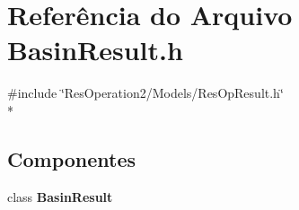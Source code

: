 \section{Referência do Arquivo Basin\+Result.\+h}
\label{_2_models_2_basin_2_basin_result_8h}
{\ttfamily \#include \char`\"{}Res\+Operation2/\+Models/\+Res\+Op\+Result.\+h\char`\"{}}\\*
\subsection*{Componentes}
\begin{DoxyCompactItemize}
\item 
class {\bf Basin\+Result}
\end{DoxyCompactItemize}
